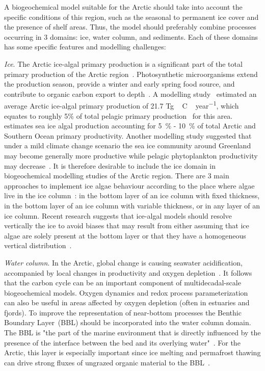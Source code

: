 \documentclass[gmd, manuscript]{copernicus}
\begin{document}
A biogeochemical model suitable for the Arctic should take into account the specific conditions of this region, such as the seasonal to permanent ice cover and the presence of shelf areas.
Thus, the model should preferably combine processes occurring in 3 domains: ice, water column, and sediments.
Each of these domains has some specific features and modelling challenges:

\emph{Ice}.
The Arctic ice-algal primary production is a significant part of the total primary production of the Arctic region~\citep{Arrigo2010}.
Photosynthetic microorganisms extend the production season, provide a winter and early spring food source, and contribute to organic carbon export to depth~\citep{Vancoppenolle2013}.
A modelling study~\citep{Jin2012} estimated an average Arctic ice-algal primary production of 21.7 \unit{Tg\,C\,year^{-1}}, which equates to roughly 5\% of total pelagic primary production~\citep{Duarte2015} for this area.
\citet{Arrigo2010} estimates sea ice algal production accounting for 5~\% - 10~\% of total Arctic and Southern Ocean primary productivity.
Another modelling study suggested that under a mild climate change scenario the sea ice community around Greenland may become generally more productive while pelagic phytoplankton productivity may decrease~\citep{Tedesco2012}.
It is therefore desirable to include the ice domain in biogeochemical modelling studies of the Arctic region.
There are 3 main approaches to implement ice algae behaviour according to the place where algae live in the ice column~\citep{Tedesco2014, Vancoppenolle2017}:
in the bottom layer of an ice column with fixed thickness,
in the bottom layer of an ice column with variable thickness,
or in any layer of an ice column.
Recent research suggests that ice-algal models should resolve vertically the ice to avoid biases that may result from either assuming that ice algae are solely present at the bottom layer or that they have a homogeneous vertical distribution~\citep{Duarte2015}.

\emph{Water column}.
In the Arctic, global change is causing seawater acidification, accompanied by local changes in productivity and oxygen depletion~\citep{Bopp2013,Henson2017}.
It follows that the carbon cycle can be an important component of multidecadal-scale biogeochemical models.
Oxygen dynamics and redox process parameterization can also be useful in areas affected by oxygen depletion (often in estuaries and fjords).
To improve the representation of near-bottom processes the Benthic Boundary Layer~(\textrm{BBL}) should be incorporated into the water column domain.
The \textrm{BBL} is "the part of the marine environment that is directly influenced by the presence of the interface between the bed and its overlying water"~\citep{Dade2001}.
For the Arctic, this layer is especially important since ice melting and permafrost thawing can drive strong fluxes of ungrazed organic material to the \textrm{BBL}~\citep{Lonne1999}.
\end{document}
